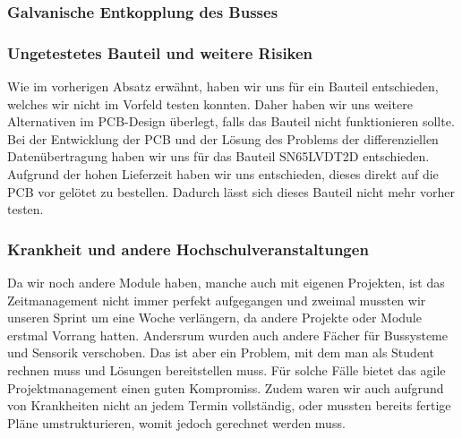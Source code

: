 \subsubsection{Galvanische Entkopplung des Busses}

\subsubsection{Ungetestetes Bauteil und weitere Risiken}
Wie im vorherigen Absatz erwähnt, haben wir uns für ein Bauteil entschieden, welches wir nicht im Vorfeld testen konnten. Daher haben wir uns weitere Alternativen im PCB-Design überlegt, falls das Bauteil nicht funktionieren sollte. Bei der Entwicklung der PCB und der Lösung des Problems der differenziellen Datenübertragung haben wir uns für das Bauteil SN65LVDT2D entschieden. Aufgrund der hohen Lieferzeit haben wir uns entschieden, dieses direkt auf die PCB vor gelötet zu bestellen. Dadurch lässt sich dieses Bauteil nicht mehr vorher testen. 

\subsubsection{Krankheit und andere Hochschulveranstaltungen}
Da wir noch andere Module haben, manche auch mit eigenen Projekten, ist das Zeitmanagement nicht immer perfekt aufgegangen und zweimal mussten wir unseren Sprint um eine Woche verlängern, da andere Projekte oder Module erstmal Vorrang hatten. Andersrum wurden auch andere Fächer für Bussysteme und Sensorik verschoben. Das ist aber ein Problem, mit dem man als Student rechnen muss und Lösungen bereitstellen muss. Für solche Fälle bietet das agile Projektmanagement einen guten Kompromiss. Zudem waren wir auch aufgrund von Krankheiten nicht an jedem Termin vollständig, oder mussten bereits fertige Pläne umstrukturieren, womit jedoch gerechnet werden muss.

